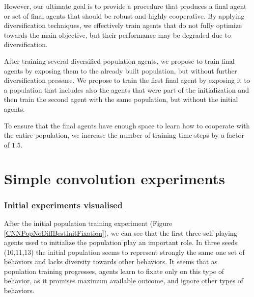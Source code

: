 However, our ultimate goal is to provide a procedure that produces a final agent or set of final agents that should be robust and highly cooperative.
By applying diversification techniques, we effectively train agents that do not fully optimize towards the main objective, but their performance may be degraded due to diversification.

After training several diversified population agents, we propose to train final agents by exposing them to the already built population, but without further diversification pressure.
We propose to train the first final agent by exposing it to a population that includes also the agents that were part of the initialization and then train the second agent with the same population, but without the initial agents.

To ensure that the final agents have enough space to learn how to cooperate with the entire population, we increase the number of training time steps by a factor of $1.5$.


\section{Simple convolution experiments}

\subsubsection{Initial experiments visualised}

After the initial population training experiment (Figure \ref{CNNPopNoDiffBestInitFixation}), we can see that the first three self-playing agents used to initialize the population play an important role.
In three seeds (10,11,13) the initial population seems to represent strongly the same one set of behaviors and lacks diversity towards other behaviors.
It seems that as population training progresses, agents learn to fixate only on this type of behavior, as it promises maximum available outcome, and ignore other types of behaviors.

